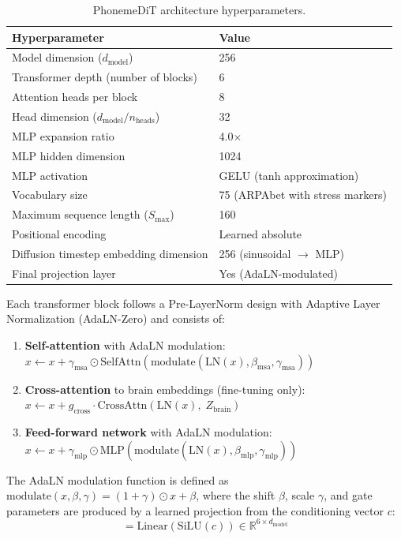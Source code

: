 \documentclass{article}
\begin{document}
\begin{table}[h]
\centering
\caption{PhonemeDiT architecture hyperparameters.}
\label{tab:dit_hyperparams}
\begin{tabular}{ll}
\toprule
\textbf{Hyperparameter} & \textbf{Value} \\
\midrule
Model dimension ($d_{\text{model}}$) & 256 \\
Transformer depth (number of blocks) & 6 \\
Attention heads per block & 8 \\
Head dimension ($d_{\text{model}} / n_{\text{heads}}$) & 32 \\
MLP expansion ratio & 4.0$\times$ \\
MLP hidden dimension & 1024 \\
MLP activation & GELU (tanh approximation) \\
Vocabulary size & 75 (ARPAbet with stress markers) \\
Maximum sequence length ($S_{\text{max}}$) & 160 \\
Positional encoding & Learned absolute \\
Diffusion timestep embedding dimension & 256 (sinusoidal $\rightarrow$ MLP) \\
Final projection layer & Yes (AdaLN-modulated) \\
\bottomrule
\end{tabular}
\end{table}
 
Each transformer block follows a Pre-LayerNorm design with Adaptive Layer Normalization (AdaLN-Zero) \cite{peebles2023dit} and consists of:
\begin{enumerate}
    \item \textbf{Self-attention} with AdaLN modulation: $x \leftarrow x + \gamma_{\text{msa}} \odot \mathrm{SelfAttn}(\mathrm{modulate}(\mathrm{LN}(x), \beta_{\text{msa}}, \gamma_{\text{msa}}))$
    \item \textbf{Cross-attention} to brain embeddings (fine-tuning only): $x \leftarrow x + g_{\text{cross}} \cdot \mathrm{CrossAttn}(\mathrm{LN}(x),\; Z_{\text{brain}})$
    \item \textbf{Feed-forward network} with AdaLN modulation: $x \leftarrow x + \gamma_{\text{mlp}} \odot \mathrm{MLP}(\mathrm{modulate}(\mathrm{LN}(x), \beta_{\text{mlp}}, \gamma_{\text{mlp}}))$
\end{enumerate}
 
\noindent The AdaLN modulation function is defined as $\mathrm{modulate}(x, \beta, \gamma) = (1 + \gamma) \odot x + \beta$, where the shift $\beta$, scale $\gamma$, and gate parameters are produced by a learned projection from the conditioning vector $c$:
\begin{equation}
    [\beta_{\text{msa}}, \gamma_{\text{msa}}, g_{\text{msa}}, \beta_{\text{mlp}}, \gamma_{\text{mlp}}, g_{\text{mlp}}] = \mathrm{Linear}(\mathrm{SiLU}(c)) \in \mathbb{R}^{6 \times d_{\text{model}}}
\end{equation}
 
\end{document}
